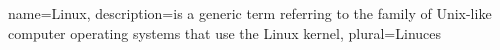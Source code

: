 {
  name=Linux,
  description={is a generic term referring to the family of Unix-like
               computer operating systems that use the Linux kernel},
  plural=Linuces
}
